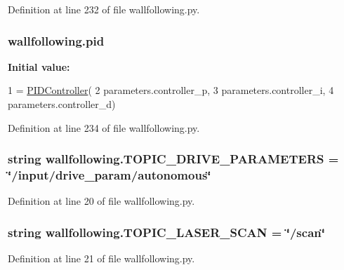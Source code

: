 Definition at line 232 of file wallfollowing.\+py.

\subsubsection[{\texorpdfstring{pid}{pid}}]{\setlength{\rightskip}{0pt plus 5cm}wallfollowing.\+pid}\hypertarget{namespacewallfollowing_adc9f95e0b626be8ddae98a596a38e7e8}{}\label{namespacewallfollowing_adc9f95e0b626be8ddae98a596a38e7e8}
{\bfseries Initial value\+:}
\begin{DoxyCode}
1 = \hyperlink{classwallfollowing_1_1_p_i_d_controller}{PIDController}(
2     parameters.controller\_p,
3     parameters.controller\_i,
4     parameters.controller\_d)
\end{DoxyCode}


Definition at line 234 of file wallfollowing.\+py.

\subsubsection[{\texorpdfstring{T\+O\+P\+I\+C\+\_\+\+D\+R\+I\+V\+E\+\_\+\+P\+A\+R\+A\+M\+E\+T\+E\+RS}{TOPIC_DRIVE_PARAMETERS}}]{\setlength{\rightskip}{0pt plus 5cm}string wallfollowing.\+T\+O\+P\+I\+C\+\_\+\+D\+R\+I\+V\+E\+\_\+\+P\+A\+R\+A\+M\+E\+T\+E\+RS = \char`\"{}/input/drive\+\_\+param/autonomous\char`\"{}}\hypertarget{namespacewallfollowing_a765ce45df7d0c3d9134fc83534029e36}{}\label{namespacewallfollowing_a765ce45df7d0c3d9134fc83534029e36}


Definition at line 20 of file wallfollowing.\+py.

\subsubsection[{\texorpdfstring{T\+O\+P\+I\+C\+\_\+\+L\+A\+S\+E\+R\+\_\+\+S\+C\+AN}{TOPIC_LASER_SCAN}}]{\setlength{\rightskip}{0pt plus 5cm}string wallfollowing.\+T\+O\+P\+I\+C\+\_\+\+L\+A\+S\+E\+R\+\_\+\+S\+C\+AN = \char`\"{}/scan\char`\"{}}\hypertarget{namespacewallfollowing_a7e38e617465ebdfa7ec0576ac63443f8}{}\label{namespacewallfollowing_a7e38e617465ebdfa7ec0576ac63443f8}


Definition at line 21 of file wallfollowing.\+py.

